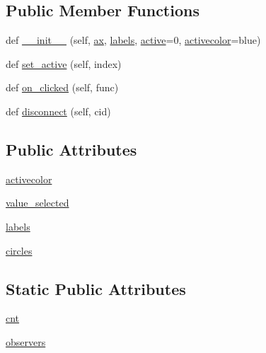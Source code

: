 \subsection*{Public Member Functions}
\begin{DoxyCompactItemize}
\item 
def \hyperlink{classmatplotlib_1_1widgets_1_1RadioButtons_aa818136aaa788c963d2793e0dbad9012}{\+\_\+\+\_\+init\+\_\+\+\_\+} (self, \hyperlink{classmatplotlib_1_1widgets_1_1AxesWidget_ac0722858b7001d10a42055dc90420b4f}{ax}, \hyperlink{classmatplotlib_1_1widgets_1_1RadioButtons_a0bc3c6546009bd9fe06be5e66999c2f5}{labels}, \hyperlink{classmatplotlib_1_1widgets_1_1Widget_a6fc79b9a86770ee3a3b46ea419b7ad74}{active}=0, \hyperlink{classmatplotlib_1_1widgets_1_1RadioButtons_a6ce66d134773281a7a1e8498dfc4ff4b}{activecolor}=\textquotesingle{}blue\textquotesingle{})
\item 
def \hyperlink{classmatplotlib_1_1widgets_1_1RadioButtons_a8261d322f9d60862093f5d96b5a4903a}{set\+\_\+active} (self, index)
\item 
def \hyperlink{classmatplotlib_1_1widgets_1_1RadioButtons_ad0aaa373d0a5f717bc4bddac898afae6}{on\+\_\+clicked} (self, func)
\item 
def \hyperlink{classmatplotlib_1_1widgets_1_1RadioButtons_a7f96c03e9756e7c4098c2fcb1ef5175d}{disconnect} (self, cid)
\end{DoxyCompactItemize}
\subsection*{Public Attributes}
\begin{DoxyCompactItemize}
\item 
\hyperlink{classmatplotlib_1_1widgets_1_1RadioButtons_a6ce66d134773281a7a1e8498dfc4ff4b}{activecolor}
\item 
\hyperlink{classmatplotlib_1_1widgets_1_1RadioButtons_adac6c1a025207ffe807ba00155316672}{value\+\_\+selected}
\item 
\hyperlink{classmatplotlib_1_1widgets_1_1RadioButtons_a0bc3c6546009bd9fe06be5e66999c2f5}{labels}
\item 
\hyperlink{classmatplotlib_1_1widgets_1_1RadioButtons_a7882ce34abcceaa3d5766c751eea563d}{circles}
\end{DoxyCompactItemize}
\subsection*{Static Public Attributes}
\begin{DoxyCompactItemize}
\item 
\hyperlink{classmatplotlib_1_1widgets_1_1RadioButtons_af02db107ef5c838f38be3a766a7d1b3c}{cnt}
\item 
\hyperlink{classmatplotlib_1_1widgets_1_1RadioButtons_ad1db0297f95b9e6218b5c0783098178f}{observers}
\end{DoxyCompactItemize}
